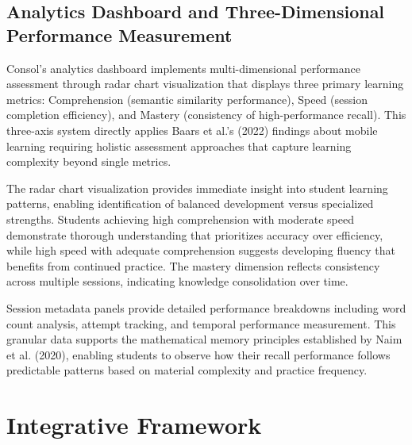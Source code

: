 {\color{maroon}
\subsection{Analytics Dashboard and Three-Dimensional Performance Measurement}

Consol's analytics dashboard implements multi-dimensional performance assessment through radar chart visualization that displays three primary learning metrics: Comprehension (semantic similarity performance), Speed (session completion efficiency), and Mastery (consistency of high-performance recall). This three-axis system directly applies Baars et al.'s (2022) findings about mobile learning requiring holistic assessment approaches that capture learning complexity beyond single metrics.

The radar chart visualization provides immediate insight into student learning patterns, enabling identification of balanced development versus specialized strengths. Students achieving high comprehension with moderate speed demonstrate thorough understanding that prioritizes accuracy over efficiency, while high speed with adequate comprehension suggests developing fluency that benefits from continued practice. The mastery dimension reflects consistency across multiple sessions, indicating knowledge consolidation over time.

Session metadata panels provide detailed performance breakdowns including word count analysis, attempt tracking, and temporal performance measurement. This granular data supports the mathematical memory principles established by Naim et al. (2020), enabling students to observe how their recall performance follows predictable patterns based on material complexity and practice frequency.
}





\section{Integrative Framework}

